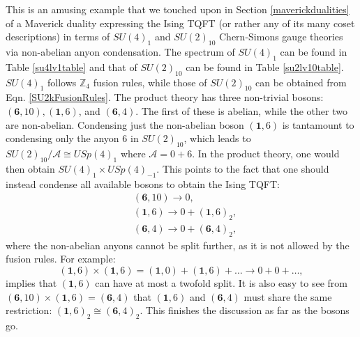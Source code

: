 \documentclass[11pt]{article}
\numberwithin{equation}{section}
\begin{document}
This is an amusing example that we touched upon in Section \ref{maverickdualities} of a Maverick duality expressing the Ising TQFT (or rather any of its many coset descriptions) in terms of $SU(4)_{1}$ and $SU(2)_{10}$ Chern-Simons gauge theories via non-abelian anyon condensation. The spectrum of $SU(4)_{1}$ can be found in Table \ref{su4lv1table} and that of $SU(2)_{10}$ can be found in Table \ref{su2lv10table}. $SU(4)_{1}$ follows $\mathbb{Z}_{4}$ fusion rules, while those of $SU(2)_{10}$ can be obtained from Eqn. \eqref{SU2kFusionRules}. The product theory has three non-trivial bosons: $(\mathbf{6},10), (\mathbf{1},6)$, and $(\mathbf{6},4)$. The first of these is abelian, while the other two are non-abelian. Condensing just the non-abelian boson $(\mathbf{1},6)$ is tantamount to condensing only the anyon $6$ in $SU(2)_{10}$, which leads to $SU(2)_{10}/\mathcal{A} \cong USp(4)_{1}$ where $\mathcal{A} = 0 + 6$. In the product theory, one would then obtain $SU(4)_{1} \times USp(4)_{-1}$. This points to the fact that one should instead condense all available bosons to obtain the Ising TQFT:
\begin{align}
    &(\mathbf{6},10) \longrightarrow 0, \\[0.3cm]
    &(\mathbf{1},6) \longrightarrow 0 + (\mathbf{1},6)_{2}, \\[0.3cm]
    &(\mathbf{6},4) \longrightarrow 0 + (\mathbf{6},4)_{2}, 
\end{align}
where the non-abelian anyons cannot be split further, as it is not allowed by the fusion rules. For example:
\begin{equation}
    (\mathbf{1},6) \times (\mathbf{1},6) = (\mathbf{1},0) + (\mathbf{1},6) + \ldots \longrightarrow 0 + 0 + \ldots,
\end{equation}
implies that $(\mathbf{1},6)$ can have at most a twofold split. It is also easy to see from $(\mathbf{6},10) \times (\mathbf{1},6) = (\mathbf{6},4)$ that $(\mathbf{1},6)$ and $(\mathbf{6},4)$ must share the same restriction: $(\mathbf{1},6)_{2} \cong (\mathbf{6},4)_{2}$. This finishes the discussion as far as the bosons go.
\end{document}
